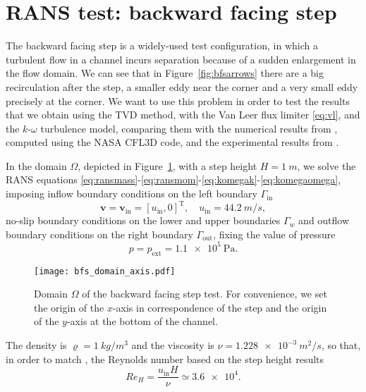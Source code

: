 \section{RANS test: backward facing step} \label{sec:bfs}
The backward facing step is a widely-used test configuration, in which a 
turbulent flow in a channel incurs separation because of a sudden enlargement 
in the flow domain. We can see that in Figure~\ref{fig:bfsarrows} there are a 
big recirculation after the step, a smaller eddy near the corner and a very 
small 
eddy precisely at the corner. We want to use this problem in order to test the 
results that we obtain using the TVD method, with the Van Leer flux limiter 
\eqref{eq:vl}, and the $k\text{-}\omega$ turbulence model, comparing them with 
the numerical results from \cite{web:nasa}, computed using the NASA CFL3D code, 
and the experimental results from \cite{bfs:driver}.

In the domain $\Omega$, depicted in Figure~\ref{fig:bfsdomain}, with a step height $H=\SI{1}{m}$, we solve the RANS equations \eqref{eq:ransmass}-\eqref{eq:ransmom}-\eqref{eq:komegak}-\eqref{eq:komegaomega}, imposing inflow boundary conditions on the left boundary $\Gamma_\text{in}$
\begin{equation}
	\mathbf{v} = \mathbf{v}_\text{in} = [u_\text{in}, 0]^\mathrm{T}, \quad u_\text{in} = \SI{44.2}{m/s},
\end{equation} no-slip boundary conditions on the lower and upper boundaries $\Gamma_w$ and outflow boundary conditions on the right boundary $\Gamma_\text{out}$, fixing the value of pressure
\begin{equation}
	p = p_\text{ext} = \SI{1.1e5}{\pascal}.
\end{equation}
\begin{figure}
	\centering
	\texttt{[image: bfs\_domain\_axis.pdf]}
	\caption[Domain of the backward facing step test]{Domain $\Omega$ of the backward facing step test. For convenience, we set the origin of the $x$-axis in correspondence of the step and the origin of the $y$-axis at the bottom of the channel.}
	\label{fig:bfsdomain}
\end{figure}
The density is $\varrho = \SI{1}{kg/m^3}$ and the viscosity is $\nu=\SI{1.228e-3}{m^2/s}$, so that, in order to match \cite{web:nasa}, the Reynolds number based on the step height results
\begin{equation}
	Re_H = \frac{u_\text{in}H}{\nu} \simeq \num{3.6e4}.
\end{equation}

